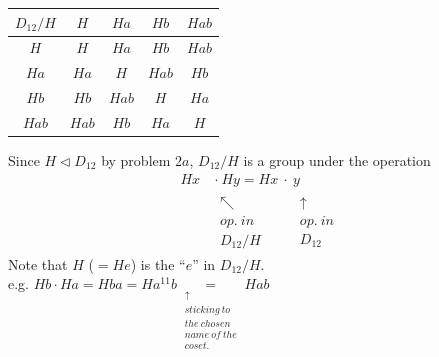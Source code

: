 \begin{enumerate}
    \begin{center}
        \begin{minipage}{0.45\textwidth}
            \begin{tabular}{c||c|c|c|c}
                $D_{12}/H$ & $H$ & $Ha$ & $Hb$ & $Hab$ \\ \hline \hline
                $H$ & $H$ & $Ha$ & $Hb$ & $Hab$ \\ \hline
                $Ha$ & $Ha$& $H$ & $Hab$ & $Hb$ \\ \hline
                $Hb$ & $Hb$ & $Hab$ & $H$ & $Ha$ \\ \hline
                $Hab$ & $Hab$ & $Hb$ & $Ha$ & $H$ \\ 
            \end{tabular}
        \end{minipage}
        \begin{minipage}{0.45\textwidth}
            Since $H\triangleleft D_{12}$ by problem $2a$, $D_{12}/H$ is a group under the operation 
            \begin{align*}
                Hx \ &\cdot \ Hy = H x \ \cdot \ y \\
                &\substack{\nwarrow \\ op. \ in \\ D_{12}/H} \ \ \ \ \ \ \ \ \  \substack{\uparrow \\ op. \ in \\ D_{12}}
            \end{align*}
            Note that $H$ ($=He$) is the ``$e$'' in $D_{12}/H$. \\
            e.g. $Hb \cdot Ha = Hba = Ha^{11}b \underset{\substack{\uparrow \\ sticking \ to \\ the \ chosen \\ name \ of \ the \\ coset.}}{=} Hab $ 
        \end{minipage}
    \end{center}
    

\end{enumerate}
